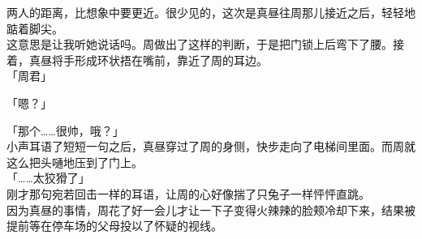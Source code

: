 两人的距离，比想象中要更近。很少见的，这次是真昼往周那儿接近之后，轻轻地踮着脚尖。\\

这意思是让我听她说话吗。周做出了这样的判断，于是把门锁上后弯下了腰。接着，真昼将手形成环状捂在嘴前，靠近了周的耳边。\\

「周君」

「嗯？」

「那个……很帅，哦？」\\

小声耳语了短短一句之后，真昼穿过了周的身侧，快步走向了电梯间里面。而周就这么把头嗵地压到了门上。\\

「……太狡猾了」\\

刚才那句宛若回击一样的耳语，让周的心好像揣了只兔子一样怦怦直跳。\\

因为真昼的事情，周花了好一会儿才让一下子变得火辣辣的脸颊冷却下来，结果被提前等在停车场的父母投以了怀疑的视线。
